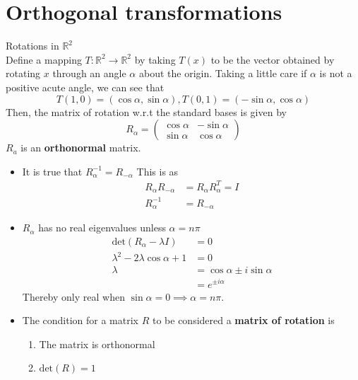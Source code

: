 \documentclass[journal, letterpaper]{IEEEtran}
\begin{document}
    \section{Orthogonal transformations}
    \begin{mybox}{Rotations in $\mathbb{R}^2$} \\ 
        Define a mapping $T : \mathbb{R}^2 \to \mathbb{R}^2$ by taking $T(x)$ to be the vector obtained by rotating $x$ through an angle $\alpha$ about the origin. Taking a little care if $\alpha$ is not a positive acute angle, we can see that
        $$ T(1, 0) = (\cos\alpha, \sin\alpha), T(0, 1) = (-\sin\alpha, \cos\alpha)$$
        Then, the matrix of rotation w.r.t the standard bases is given by
        $$ R_{\alpha} = \begin{pmatrix}
            \cos\alpha & -\sin\alpha \\ \sin\alpha & \cos\alpha
        \end{pmatrix}$$
        $R_a$ is an \textbf{orthonormal} matrix.
    \end{mybox}
    \begin{itemize}
        \item It is true that $R_\alpha^{-1} = R_{-\alpha}$
        This is as
        \begin{align*}
            R_\alpha R_{-\alpha} &= R_\alpha R_{\alpha}^T = I \\ 
            R_{\alpha}^{-1} &= R_{-\alpha}
        \end{align*}
        \item $R_\alpha$ has no real eigenvalues unless $\alpha = n\pi$
        \begin{align*}
            \text{det}(R_\alpha - \lambda I) &= 0 \\
            \lambda^2 - 2\lambda \cos\alpha + 1 &= 0 \\ 
            \lambda &= \cos\alpha  \pm i\sin\alpha \\ 
            &= e^{\pm i \alpha}
        \end{align*}
        Thereby only real when $\sin\alpha = 0 \implies \alpha = n\pi$.
        \item The condition for a matrix $R$ to be considered a \textbf{matrix of rotation} 
        is 
        \begin{enumerate}
            \item The matrix is orthonormal
            \item $\text{det}(R) = 1$
        \end{enumerate}
    \end{itemize}
\end{document}
